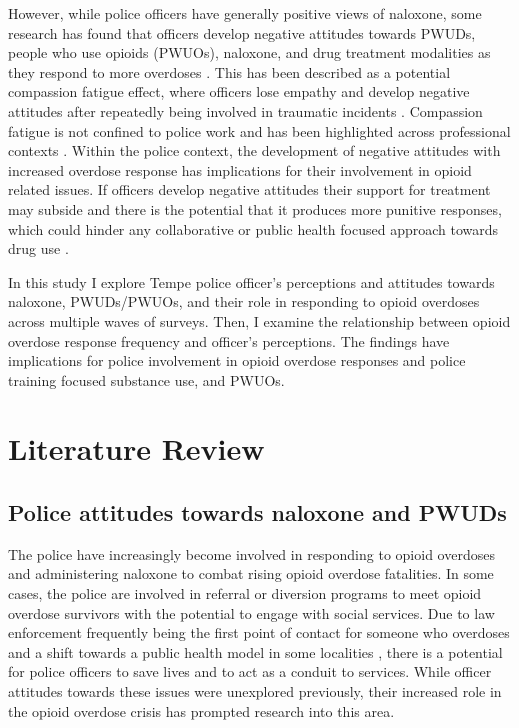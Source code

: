 However, while police officers have generally positive views of naloxone, some research has found that officers develop negative attitudes towards PWUDs, people who use opioids (PWUOs), naloxone, and drug treatment modalities as they respond to more overdoses \parencite{carroll_knowledge_2020, murphy_police_2020, murphy_police_2021}. This has been described as a potential compassion fatigue effect, where officers lose empathy and develop negative attitudes after repeatedly being involved in traumatic incidents \parencite{figley_compassion_1995, figley_treating_2002}. Compassion fatigue is not confined to police work and has been highlighted across professional contexts \parencite{adams_compassion_2006}. Within the police context, the development of negative attitudes with increased overdose response has implications for their involvement in opioid related issues. If officers develop negative attitudes their support for treatment may subside and there is the potential that it produces more punitive responses, which could hinder any collaborative or public health focused approach towards drug use \parencite{winstanley_bell_2020}.

In this study I explore Tempe police officer's perceptions and attitudes towards naloxone, PWUDs/PWUOs, and their role in responding to opioid overdoses across multiple waves of surveys. Then, I examine the relationship between opioid overdose response frequency and officer's perceptions. The findings have implications for police involvement in opioid overdose responses and police training focused substance use, and PWUOs.

\section{Literature Review}
\subsection{Police attitudes towards naloxone and PWUDs}
The police have increasingly become involved in responding to opioid overdoses and administering naloxone to combat rising opioid overdose fatalities. In some cases, the police are involved in referral or diversion programs to meet opioid overdose survivors with the potential to engage with social services. Due to law enforcement frequently being the first point of contact for someone who overdoses and a shift towards a public health model in some localities \parencite{beletsky_police_2011, silverman_harmonizing_2012}, there is a potential for police officers to save lives and to act as a conduit to services. While officer attitudes towards these issues were unexplored previously, their increased role in the opioid overdose crisis has prompted research into this area.


